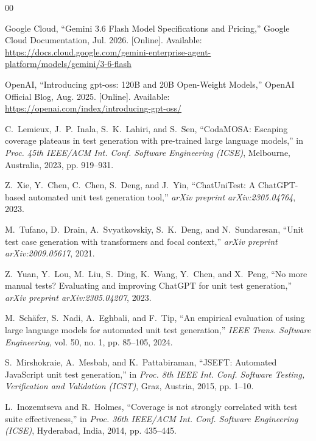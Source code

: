 \documentclass[conference]{IEEEtran}
\begin{document}

\begin{thebibliography}{00}

Google Cloud, ``Gemini 3.6 Flash Model Specifications and Pricing,'' Google Cloud Documentation, Jul. 2026. [Online]. Available: \url{https://docs.cloud.google.com/gemini-enterprise-agent-platform/models/gemini/3-6-flash}

OpenAI, ``Introducing gpt-oss: 120B and 20B Open-Weight Models,'' OpenAI Official Blog, Aug. 2025. [Online]. Available: \url{https://openai.com/index/introducing-gpt-oss/}

C.~Lemieux, J.~P.~Inala, S.~K.~Lahiri, and S.~Sen,
``CodaMOSA: Escaping coverage plateaus in test generation with pre-trained large language models,''
in \textit{Proc. 45th IEEE/ACM Int. Conf. Software Engineering (ICSE)}, Melbourne, Australia, 2023, pp. 919--931.

Z.~Xie, Y.~Chen, C.~Chen, S.~Deng, and J.~Yin,
``ChatUniTest: A ChatGPT-based automated unit test generation tool,''
\textit{arXiv preprint arXiv:2305.04764}, 2023.

M.~Tufano, D.~Drain, A.~Svyatkovskiy, S.~K.~Deng, and N.~Sundaresan,
``Unit test case generation with transformers and focal context,''
\textit{arXiv preprint arXiv:2009.05617}, 2021.

Z.~Yuan, Y.~Lou, M.~Liu, S.~Ding, K.~Wang, Y.~Chen, and X.~Peng,
``No more manual tests? Evaluating and improving ChatGPT for unit test generation,''
\textit{arXiv preprint arXiv:2305.04207}, 2023.

M.~Sch\"afer, S.~Nadi, A.~Eghbali, and F.~Tip,
``An empirical evaluation of using large language models for automated unit test generation,''
\textit{IEEE Trans. Software Engineering}, vol. 50, no. 1, pp. 85--105, 2024.

S.~Mirshokraie, A.~Mesbah, and K.~Pattabiraman,
``JSEFT: Automated JavaScript unit test generation,''
in \textit{Proc. 8th IEEE Int. Conf. Software Testing, Verification and Validation (ICST)}, Graz, Austria, 2015, pp. 1--10.

L.~Inozemtseva and R.~Holmes,
``Coverage is not strongly correlated with test suite effectiveness,''
in \textit{Proc. 36th IEEE/ACM Int. Conf. Software Engineering (ICSE)}, Hyderabad, India, 2014, pp. 435--445.

\end{thebibliography}
\end{document}
